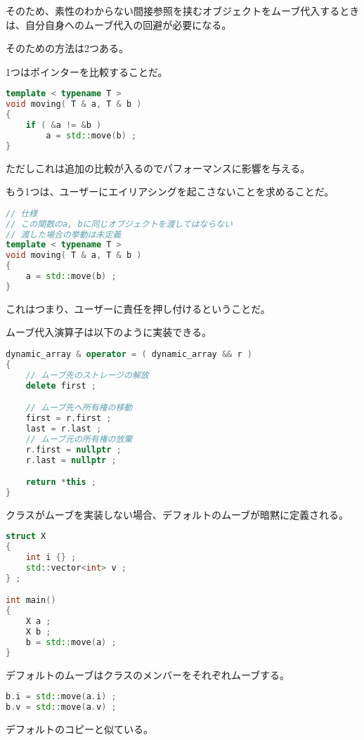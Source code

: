 そのため、素性のわからない間接参照を挟むオブジェクトをムーブ代入するときは、自分自身へのムーブ代入の回避が必要になる。

そのための方法は2つある。

1つはポインターを比較することだ。

\begin{lstlisting}[language={C++}]
template < typename T >
void moving( T & a, T & b )
{
    if ( &a != &b )
        a = std::move(b) ;
}
\end{lstlisting}

ただしこれは追加の比較が入るのでパフォーマンスに影響を与える。

もう1つは、ユーザーにエイリアシングを起こさないことを求めることだ。

\ifTombow\enlargethispage{3mm}\fi
\begin{lstlisting}[language={C++}]
// 仕様
// この関数のa, bに同じオブジェクトを渡してはならない
// 渡した場合の挙動は未定義
template < typename T >
void moving( T & a, T & b )
{
    a = std::move(b) ;
}
\end{lstlisting}

これはつまり、ユーザーに責任を押し付けるということだ。

ムーブ代入演算子は以下のように実装できる。

\begin{lstlisting}[language={C++}]
dynamic_array & operator = ( dynamic_array && r )
{
    // ムーブ先のストレージの解放
    delete first ;

    // ムーブ先へ所有権の移動
    first = r.first ;
    last = r.last ;
    // ムーブ元の所有権の放棄
    r.first = nullptr ;
    r.last = nullptr ;

    return *this ;
}
\end{lstlisting}


クラスがムーブを実装しない場合、デフォルトのムーブが暗黙に定義される。

\begin{lstlisting}[language={C++}]
struct X
{
    int i {} ;
    std::vector<int> v ;
} ;

int main()
{
    X a ;
    X b ;
    b = std::move(a) ;
}
\end{lstlisting}

デフォルトのムーブはクラスのメンバーをそれぞれムーブする。

\begin{lstlisting}[language={C++}]
b.i = std::move(a.i) ;
b.v = std::move(a.v) ;
\end{lstlisting}

デフォルトのコピーと似ている。
